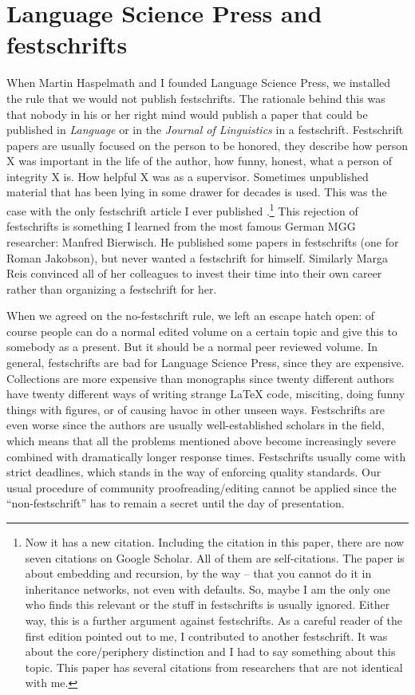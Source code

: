 \documentclass[output=paper,colorlinks,citecolor=brown]{langscibook}
\begin{document}
\section{Language Science Press and festschrifts}

When Martin Haspelmath and I founded Language Science Press, we installed the rule that we would
not publish festschrifts. The rationale behind this was that nobody in his or her right mind would
publish a paper that could be published in \emph{Language} or in the \emph{Journal of Linguistics} in a
festschrift. Festschrift papers are usually focused on the person to be honored, they describe how
person X was important in the life of the author, how funny, honest, what a person of integrity X is. How helpful X was
as a supervisor. Sometimes
unpublished material that has been lying in some drawer for decades is used. This was the case
with the only festschrift article I ever published \citep{MuellerDefaults}.\footnote{
  Now it has a new citation. Including the citation in this paper, there are now seven citations on
  Google Scholar. All of them are self-citations. The paper is about embedding and recursion, by the way -- that you
  cannot do it in inheritance networks, not even with defaults. So, maybe I am the only one who
  finds this relevant or the stuff in festschrifts is usually ignored. Either way, this is a further
  argument against festschrifts. As a careful reader of the first edition pointed out to me, I
  contributed to another festschrift. It was about the core/periphery distinction \citep{MuellerKernigkeit} and I had to say
  something about this topic. This paper has several citations from researchers that are not
  identical with me.
}
This rejection of festschrifts is something I learned from the most famous German MGG researcher:
Manfred Bierwisch. He published some papers in festschrifts (one for Roman Jakobson), but never
wanted a festschrift for himself. Similarly Marga Reis convinced all of her colleagues to invest
their time into their own career rather than organizing a festschrift for her.

When we agreed on the no-festschrift rule, we left an escape hatch open: of course people can do a
normal edited volume on a certain topic and give this to somebody as a present. But it should be a
normal peer reviewed volume. In general, festschrifts are bad for Language Science Press, since they are
expensive. Collections are more expensive than monographs since twenty different authors have twenty
different ways of writing strange \LaTeX{} code, misciting, doing funny things with figures, or of causing havoc
in other unseen ways. Festschrifts are even worse since the authors are usually well-established scholars
in the field, which means that all the problems mentioned above become increasingly severe combined with
dramatically longer response times. Festschrifts usually come with strict deadlines, which stands in the
way of enforcing quality standards. Our usual procedure of community proofreading/editing cannot be
applied since the ``non-festschrift'' has to remain a secret until the day of presentation. 
\end{document}
